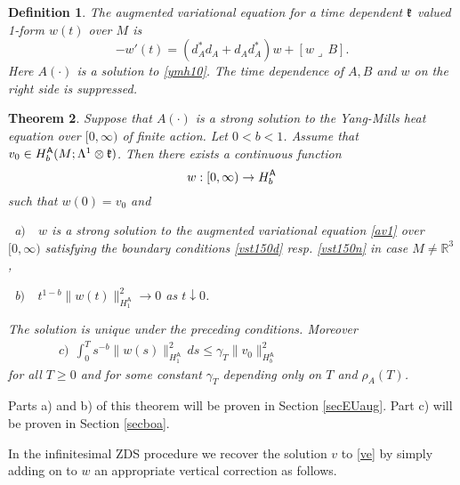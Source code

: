 \documentclass[12pt]{article}
\newtheorem{theorem}{Theorem}[section]
\newtheorem{definition}[theorem]{Definition}
\def \L{\Lambda}
\def \R{\mathbb R}
\def \As{\mathsf{A}}
\def \kf{\frak k}
\def \beq{\begin{equation}}
\def \eeq{\end{equation}}
\def \eref{\eqref}
\def \lrc{\lrcorner\,}
\numberwithin{equation}{section}
\begin{document}
 

\begin{definition}{\rm The {\it augmented variational equation} for a time dependent $\kf$ valued
1-form  $w(t)$ over $M$ is
\beq
-w'(t) = (d_A^*d_A +d_Ad_A^*)w + [w\lrc B].      \label{av1}
\eeq
Here $A(\cdot)$ is a solution to \eref{ymh10}. The time dependence of $A, B$ and $w$ on the right side is suppressed.
}
\end{definition}

\begin{theorem}\label{thmwe} Suppose that $A(\cdot)$ is a strong solution to the Yang-Mills heat 
equation over $[0, \infty)$ of finite action. 
Let $0 < b <1$.   
 Assume that $v_0 \in H_b^\As(M;\L^1\otimes \kf)$. 
Then there exists a continuous function
 \beq
 w:[0, \infty) \rightarrow H_b^\As   \notag
 \eeq 
 such that $w(0) = v_0$ and
 
\   a$)$\ \  $w$ is a strong solution to the augmented variational equation \eref{av1} over $[0, \infty)$ 
satisfying the boundary conditions  \eref{vst150d} resp. \eref{vst150n} in case $M \ne \R^3$, 


\ b$)$\ \  $t^{1-b} \| w(t)\|_{H_1^\As}^2 \rightarrow 0$ as $t \downarrow 0$.

\noindent
The solution is unique under the preceding conditions. Moreover
\begin{align}
c)\ \ \int_0^T s^{-b} \|w(s)\|_{H_1^\As}^2\, ds  \le \gamma_T \| v_0\|_{H_b^\As}^2
                                                                        \ \qquad\qquad\qquad \qquad\qquad   \label{av5}
\end{align}
for all $T \ge 0$ and for some constant $\gamma_T$ depending only on $T$ and $\rho_A(T)$.
\end{theorem}
Parts a) and b) of this theorem   will be proven in Section \ref{secEUaug}.  
Part c) will be proven in Section \ref{secboa}.



In the infinitesimal ZDS procedure we recover the solution $v$ to \eref{ve} by simply adding
on to $w$ an appropriate vertical correction 
 as follows.
\end{document}
